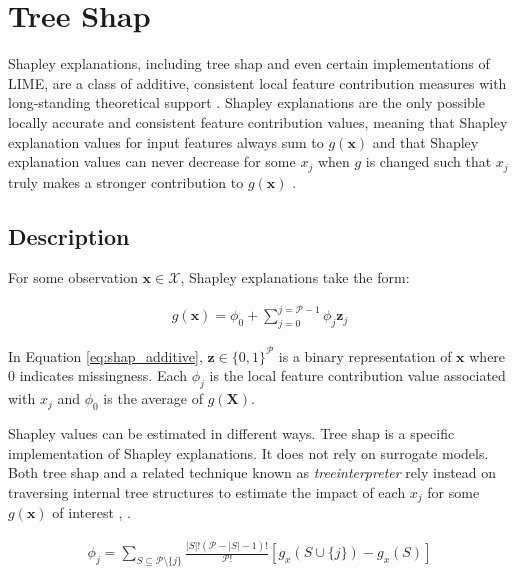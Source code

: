 \documentclass[11pt]{asaproc}
\begin{document}
\section{Tree Shap} \label{sec:shap}

Shapley explanations, including tree shap and even certain implementations of LIME, are a class of additive, consistent local feature contribution measures with long-standing theoretical support \cite{shapley}. Shapley explanations are the only possible locally accurate and consistent feature contribution values, meaning that Shapley explanation values for input features always sum to $g(\mathbf{x})$ and that Shapley explanation values can never decrease for some $x_j$ when $g$ is changed such that $x_j$ truly makes a stronger contribution to $g(\mathbf{x})$ \cite{shapley}. 

\vspace{10pt}

\subsection{Description}

For some observation $\mathbf{x} \in \mathcal{X}$, Shapley explanations take the form:

\begin{equation}
\label{eq:shap_additive}
\begin{aligned}
g(\mathbf{x}) = \phi_0 + \sum_{j=0}^{j=\mathcal{P} - 1} \phi_j \mathbf{z}_j
\end{aligned}
\end{equation}

\noindent In Equation \ref{eq:shap_additive}, $\mathbf{z} \in \{0,1\}^\mathcal{P}$ is a binary representation of $\mathbf{x}$ where 0 indicates missingness. Each $\phi_j$ is the local feature contribution value associated with $x_j$ and $\phi_0$ is the average of $g(\mathbf{X})$. 

Shapley values can be estimated in different ways. Tree shap is a specific implementation of Shapley explanations. It does not rely on surrogate models. Both tree shap and a related technique known as \textit{treeinterpreter} rely instead on traversing internal tree structures to estimate the impact of each $x_j$ for some $g(\mathbf{x})$ of interest \cite{tree_shap}, \cite{treeinterpreter}.

\begin{equation}
\label{eq:shap_contrib}
\begin{aligned}
\phi_{j} = \sum_{S \subseteq \mathcal{P} \setminus \{j\}}\frac{|S|!(\mathcal{P} -|S| -1)!}{\mathcal{P}!}[g_x(S \cup \{j\}) - g_x(S)]
\end{aligned}
\end{equation}
\end{document}
